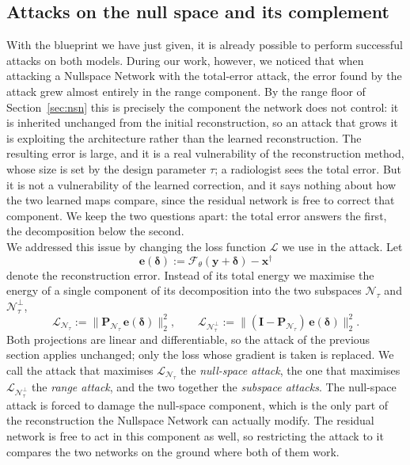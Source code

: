 \documentclass{article}
\numberwithin{equation}{section}
\begin{document}
\subsection{Attacks on the null space and its complement}\label{sec:subspace}
With the blueprint we have just given, it is already possible to perform successful attacks
on both models. During our work, however, we noticed that when attacking a Nullspace
Network with the total-error attack, the error found by the attack grew almost
entirely in the range component. By the range floor of Section~\ref{sec:nsn} this is
precisely the component the network does not control: it is inherited unchanged from the
initial reconstruction, so an attack that grows it is exploiting the architecture rather
than the learned reconstruction. The resulting error is large, and it is a real vulnerability of the
reconstruction method, whose size is set by the design parameter $\tau$; a radiologist sees the total
error. But it is not a vulnerability of the learned correction, and it says nothing about how the two
learned maps compare, since the residual network is free to correct that component. We keep the two
questions apart: the total error answers the first, the decomposition below the second.\\
We addressed this issue by changing the loss function $\mathcal{L}$ we use in the attack. Let
\[\mathbf{e}(\boldsymbol{\delta}):=\mathcal{F}_\theta(\mathbf{y}+\boldsymbol{\delta})-\mathbf{x}^\dagger\]
denote the reconstruction error. Instead of its total energy we maximise the energy of a
single component of its decomposition into the two subspaces $\mathcal{N}_\tau$ and $\mathcal{N}_\tau^\perp$,
\[\mathcal{L}_{\mathcal{N}_\tau}:=\lVert \mathbf{P}_{\mathcal{N}_\tau}\,\mathbf{e}(\boldsymbol{\delta})\rVert_2^2,
\qquad
\mathcal{L}_{\mathcal{N}_\tau^\perp}:=\lVert (\mathbf{I}-\mathbf{P}_{\mathcal{N}_\tau})\,\mathbf{e}(\boldsymbol{\delta})\rVert_2^2 .\]
Both projections are linear and differentiable, so the attack of the previous section
applies unchanged; only the loss whose gradient is taken is replaced. We call the attack that
maximises $\mathcal{L}_{\mathcal{N}_\tau}$ the \emph{null-space attack}, the one that maximises
$\mathcal{L}_{\mathcal{N}_\tau^\perp}$ the \emph{range attack}, and the two together the
\emph{subspace attacks}. The null-space attack is forced to damage the null-space component, which is
the only part of the reconstruction the Nullspace Network can actually modify. The residual network is free to act in this
component as well, so restricting the attack to it compares the two networks on the ground where both of them work.
\end{document}
